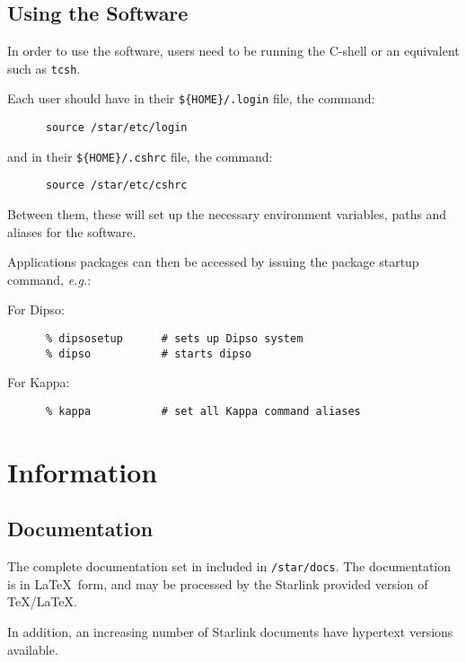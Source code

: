 \subsection{Using the Software}
\label{s:setup:using}

In order to use the software, users need to be running the C-shell or
an equivalent such as {\tt tcsh}.

Each user should have in their {\tt \$\{HOME\}/.login} file, the command:

\begin{verbatim}
      source /star/etc/login
\end{verbatim}

and in their {\tt \$\{HOME\}/.cshrc} file, the command:

\begin{verbatim}
      source /star/etc/cshrc
\end{verbatim}

Between them, these will set up the necessary environment variables,
paths and aliases for the software.

Applications packages can then be accessed by issuing the package
startup command, {\em e.g.}:

For Dipso:

\begin{verbatim}
      % dipsosetup      # sets up Dipso system
      % dipso           # starts dipso
\end{verbatim}

For Kappa:

\begin{verbatim}
      % kappa           # set all Kappa command aliases
\end{verbatim}


\section{Information}
\label{s:info}

\subsection{Documentation}
\label{s:info:docs}

The complete documentation set in included in {\tt /star/docs}.  The
documentation is in \LaTeX\ form, and may be processed by the Starlink
provided version of \TeX/\LaTeX.

In addition, an increasing number of Starlink documents have hypertext
versions available.

